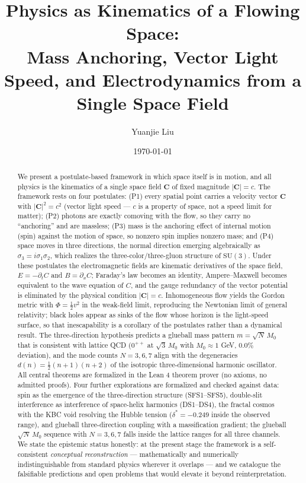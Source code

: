 \documentclass[aps,prd,preprint,superscriptaddress,amsmath,amssymb]{revtex4-2}
\begin{document}
\title{Physics as Kinematics of a Flowing Space:\\ Mass Anchoring, Vector Light Speed, and Electrodynamics from a Single Space Field}

\author{Yuanjie Liu}

\date{\today}

\begin{abstract}
We present a postulate-based framework in which space itself is in motion,
and all physics is the kinematics of a single space field $\bm{C}$ of fixed
magnitude $|\bm{C}|=c$.  The framework rests on four postulates: (P1) every
spatial point carries a velocity vector $\bm{C}$ with $|\bm{C}|^2=c^2$
(vector light speed --- $c$ is a property of space, not a speed limit for
matter); (P2) photons are exactly comoving with the flow, so they carry no
``anchoring'' and are massless; (P3) mass is the anchoring effect of internal
motion (spin) against the motion of space, so nonzero spin implies nonzero
mass; and (P4) space moves in three directions, the normal direction emerging
algebraically as $\sigma_3=i\sigma_1\sigma_2$, which realizes the
three-color/three-gluon structure of $\mathrm{SU}(3)$.  Under these
postulates the electromagnetic fields are kinematic derivatives of the space
field, $E=-\partial_t C$ and $B=\partial_x C$; Faraday's law becomes an
identity, Ampere--Maxwell becomes equivalent to the wave equation of $C$, and
the gauge redundancy of the vector potential is eliminated by the physical
condition $|\bm{C}|=c$.  Inhomogeneous flow yields the Gordon metric with
$\Phi=\frac12 v^2$ in the weak-field limit, reproducing the Newtonian limit
of general relativity; black holes appear as sinks of the flow whose horizon
is the light-speed surface, so that inescapability is a corollary of the
postulates rather than a dynamical result.  The three-direction hypothesis
predicts a glueball mass pattern $m=\sqrt{N}\,M_0$ that is consistent with
lattice QCD ($0^{++}$ at $\sqrt3\,M_0$ with $M_0\approx1$ GeV, $0.0\%$
deviation), and the mode counts $N=3,6,7$ align with the degeneracies
$d(n)=\frac12(n+1)(n+2)$ of the isotropic three-dimensional harmonic
oscillator.  All central theorems are formalized in the Lean 4 theorem prover
(no axioms, no admitted proofs).  Four further explorations are
formalized and checked against data: spin as the emergence of the
three-direction structure (SFS1--SFS5), double-slit interference as
interference of space-helix harmonics (DS1--DS4), the fractal cosmos
with the KBC void resolving the Hubble tension ($\delta^*=-0.249$
inside the observed range), and glueball three-direction coupling with
a massification gradient; the glueball $\sqrt{N}\,M_0$ sequence with
$N=3,6,7$ falls inside the lattice ranges for all three channels.  We state the epistemic status honestly:
at the present stage the framework is a self-consistent \emph{conceptual
reconstruction} --- mathematically and numerically indistinguishable from
standard physics wherever it overlaps --- and we catalogue the falsifiable
predictions and open problems that would elevate it beyond reinterpretation.
\end{abstract}
\end{document}
